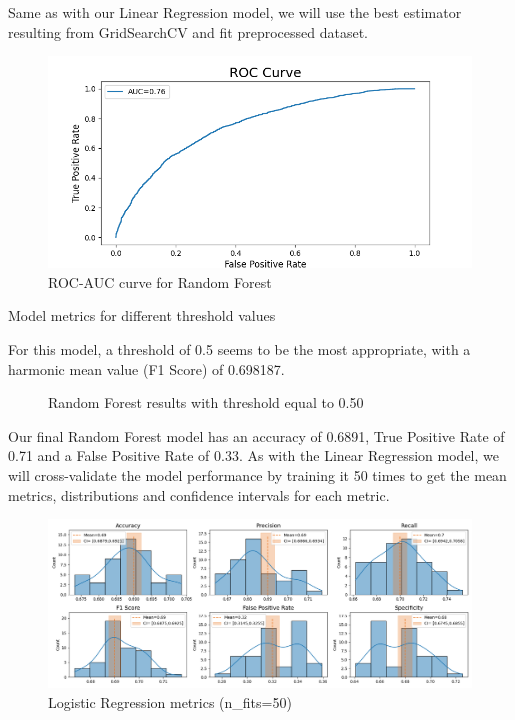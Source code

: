 \documentclass[12pt]{article}
\begin{document}
\noindent Same as with our Linear Regression model, we will use the best estimator resulting from GridSearchCV and fit preprocessed dataset.
\begin{figure}[h]
    \centering
    \includegraphics[width=\textwidth]{images/roc_rf.png}
    \caption{ROC-AUC curve for Random Forest}
    \label{fig:my_label}
\end{figure}

\begin{table}[h]
    \centering
    \begin{adjustbox}{width=1\textwidth}
    
    \end{adjustbox}{}
    \caption{Model metrics for different threshold values}
    \label{tab:my_label}
\end{table}
\newpage
\noindent For this model, a threshold of 0.5 seems to be the most appropriate, with a harmonic mean value (F1 Score) of 0.698187.
 

\begin{figure}[h]
    \centering
    \hspace{1cm}
    \caption{Random Forest results with threshold equal to 0.50}
    \label{fig:tables}
\end{figure}

\noindent Our final Random Forest model has an accuracy of 0.6891, True Positive Rate of 0.71 and a False Positive Rate of 0.33. As with the Linear Regression model, we will cross-validate the model performance by training it 50 times to get the mean metrics, distributions and confidence intervals for each metric.

\begin{figure}[h]
    \centering
    \includegraphics[width=1.15\textwidth]{images/rf_metrics_graph.png}
    \caption{Logistic Regression metrics (n\_fits=50)}
    \label{fig:my_label}
\end{figure}
\end{document}
